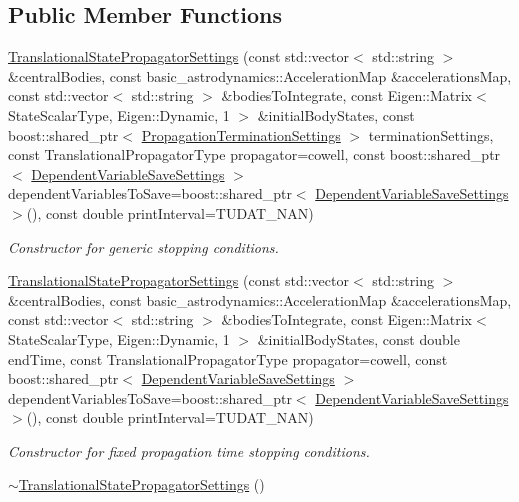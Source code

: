 \subsection*{Public Member Functions}
\begin{DoxyCompactItemize}
\item 
\hyperlink{classtudat_1_1propagators_1_1TranslationalStatePropagatorSettings_aeb34f5d8119a600e5f92ce56a3ec4cb9}{Translational\+State\+Propagator\+Settings} (const std\+::vector$<$ std\+::string $>$ \&central\+Bodies, const basic\+\_\+astrodynamics\+::\+Acceleration\+Map \&accelerations\+Map, const std\+::vector$<$ std\+::string $>$ \&bodies\+To\+Integrate, const Eigen\+::\+Matrix$<$ State\+Scalar\+Type, Eigen\+::\+Dynamic, 1 $>$ \&initial\+Body\+States, const boost\+::shared\+\_\+ptr$<$ \hyperlink{classtudat_1_1propagators_1_1PropagationTerminationSettings}{Propagation\+Termination\+Settings} $>$ termination\+Settings, const Translational\+Propagator\+Type propagator=cowell, const boost\+::shared\+\_\+ptr$<$ \hyperlink{classtudat_1_1propagators_1_1DependentVariableSaveSettings}{Dependent\+Variable\+Save\+Settings} $>$ dependent\+Variables\+To\+Save=boost\+::shared\+\_\+ptr$<$ \hyperlink{classtudat_1_1propagators_1_1DependentVariableSaveSettings}{Dependent\+Variable\+Save\+Settings} $>$(), const double print\+Interval=T\+U\+D\+A\+T\+\_\+\+N\+AN)
\begin{DoxyCompactList}\small\item\em Constructor for generic stopping conditions. \end{DoxyCompactList}\item 
\hyperlink{classtudat_1_1propagators_1_1TranslationalStatePropagatorSettings_a0f603240bbc01dd29d3cdf100390fdeb}{Translational\+State\+Propagator\+Settings} (const std\+::vector$<$ std\+::string $>$ \&central\+Bodies, const basic\+\_\+astrodynamics\+::\+Acceleration\+Map \&accelerations\+Map, const std\+::vector$<$ std\+::string $>$ \&bodies\+To\+Integrate, const Eigen\+::\+Matrix$<$ State\+Scalar\+Type, Eigen\+::\+Dynamic, 1 $>$ \&initial\+Body\+States, const double end\+Time, const Translational\+Propagator\+Type propagator=cowell, const boost\+::shared\+\_\+ptr$<$ \hyperlink{classtudat_1_1propagators_1_1DependentVariableSaveSettings}{Dependent\+Variable\+Save\+Settings} $>$ dependent\+Variables\+To\+Save=boost\+::shared\+\_\+ptr$<$ \hyperlink{classtudat_1_1propagators_1_1DependentVariableSaveSettings}{Dependent\+Variable\+Save\+Settings} $>$(), const double print\+Interval=T\+U\+D\+A\+T\+\_\+\+N\+AN)
\begin{DoxyCompactList}\small\item\em Constructor for fixed propagation time stopping conditions. \end{DoxyCompactList}\item 
\hyperlink{classtudat_1_1propagators_1_1TranslationalStatePropagatorSettings_a4c352939e8125405eb00e900d434f12e}{$\sim$\+Translational\+State\+Propagator\+Settings} ()\hypertarget{classtudat_1_1propagators_1_1TranslationalStatePropagatorSettings_a4c352939e8125405eb00e900d434f12e}{}\label{classtudat_1_1propagators_1_1TranslationalStatePropagatorSettings_a4c352939e8125405eb00e900d434f12e}


\end{DoxyCompactItemize}
